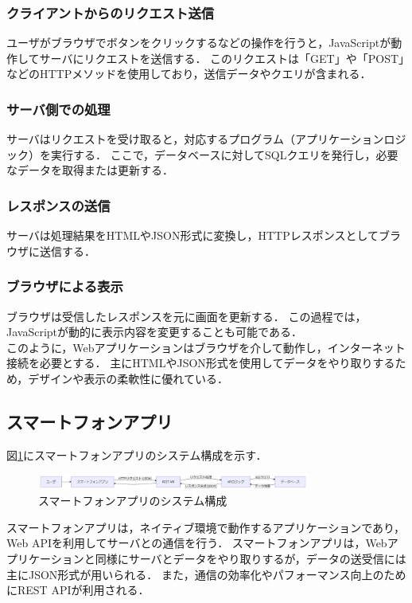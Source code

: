 \documentclass[titlepage,a4paper]{jsarticle}
\begin{document}
\subsubsection{クライアントからのリクエスト送信}
ユーザがブラウザでボタンをクリックするなどの操作を行うと，JavaScriptが動作してサーバにリクエストを送信する．
このリクエストは「GET」や「POST」などのHTTPメソッドを使用しており，送信データやクエリが含まれる．

\subsubsection{サーバ側での処理}
サーバはリクエストを受け取ると，対応するプログラム（アプリケーションロジック）を実行する．
ここで，データベースに対してSQLクエリを発行し，必要なデータを取得または更新する．

\subsubsection{レスポンスの送信}
サーバは処理結果をHTMLやJSON形式に変換し，HTTPレスポンスとしてブラウザに送信する．

\subsubsection{ブラウザによる表示}
ブラウザは受信したレスポンスを元に画面を更新する．
この過程では，JavaScriptが動的に表示内容を変更することも可能である．\\

このように，Webアプリケーションはブラウザを介して動作し，インターネット接続を必要とする．
主にHTMLやJSON形式を使用してデータをやり取りするため，デザインや表示の柔軟性に優れている．

\subsection{スマートフォンアプリ}
図\ref{app}にスマートフォンアプリのシステム構成を示す．
\begin{figure}[H]
  \centering
  \includegraphics[width=0.8\textwidth]{img/genri/app.png}
  \caption{スマートフォンアプリのシステム構成}
  \label{app}
\end{figure}
スマートフォンアプリは，ネイティブ環境で動作するアプリケーションであり，Web APIを利用してサーバとの通信を行う．
スマートフォンアプリは，Webアプリケーションと同様にサーバとデータをやり取りするが，データの送受信には主にJSON形式が用いられる．
また，通信の効率化やパフォーマンス向上のためにREST APIが利用される．
\end{document}

